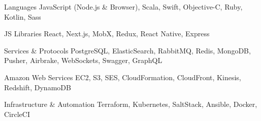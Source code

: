 
\begin{cvskills}

  \cvskill
    {Languages}
    {JavaScript (Node.js \& Browser), Scala, Swift, Objective-C, Ruby, Kotlin, Sass}

  \cvskill
    {JS Libraries}
    {React, Next.js, MobX, Redux, React Native, Express}

  \cvskill
    {Services \& Protocols}
    {PostgreSQL, ElasticSearch, RabbitMQ, Redis, MongoDB, Pusher, Airbrake, WebSockets, Swagger, GraphQL}

  \cvskill
    {Amazon Web Services}
    {EC2, S3, SES, CloudFormation, CloudFront, Kinesis, Redshift, DynamoDB}

  \cvskill
    {Infrastructure \& Automation}
    {Terraform, Kubernetes, SaltStack, Ansible, Docker, CircleCI}

\end{cvskills}
